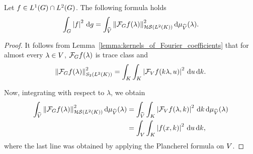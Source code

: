\begin{proposition}
\label{proposition:Plancherel_formula}
    Let $f \in \Lebesgue{1}{\Group} \cap \Lebesgue{2}{\Group}$.
    The following formula holds
    \begin{align}
        \int_G \abs{f}^2 \dd g = \int_\dualGroup{\VectorSpace} \norm[\HilbertSchmidt{\Lebesgue{2}{\CompactGroup}}]{\Fourier{f}(\lambda)}^2 \dd \Plancherel{\VectorSpace}(\lambda).
        \label{proposition:Plancherel_formula:formula}
    \end{align}
\end{proposition}
\begin{proof}
    It follows from Lemma~\ref{lemma:kernels_of_Fourier_coefficients} that for almost every $\lambda \in \VectorSpace$,
    $\Fourier f(\lambda)$ is trace class and
    \begin{align*}
        \norm[\SchattenClasses{2}{\Lebesgue{2}\CompactGroup}]{\Fourier f(\lambda)}^2
        = \int_\CompactGroup \int_\CompactGroup \abs{\Fourier[\VectorSpace] f(k \lambda, u)}^2 \dd u \dd k.
    \end{align*}

    Now, integrating with respect to $\lambda$,
    we obtain
    \begin{align*}
        \int_\dualGroup{\VectorSpace} \norm[\HilbertSchmidt{\Lebesgue{2}{\CompactGroup}}]{\Fourier{f}(\lambda)}^2 \dd \Plancherel{\VectorSpace}(\lambda)
        &= \int_\dualGroup{\VectorSpace} \int_\CompactGroup \abs{\Fourier[\VectorSpace]{f}(\lambda, k)}^2 \dd k \dd \Plancherel{\VectorSpace}(\lambda)\\
        &= \int_\VectorSpace \int_\CompactGroup \abs{f(x, k)}^2 \dd u \dd k,
    \end{align*}
    where the last line was obtained by applying the Plancherel formula on $\VectorSpace$.
\end{proof}

